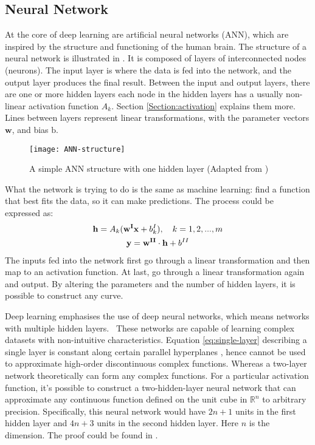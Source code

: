 \subsection{Neural Network}

At the core of deep learning are artificial neural networks (ANN), which are inspired by the structure and functioning of the human brain. 
The structure of a neural network is illustrated in . It is composed of layers of interconnected nodes (neurons). 
The input layer is where the data is fed into the network, and the output layer produces the final result. Between the input and output layers, there are one or more hidden layers 
each node in the hidden layers has a usually non-linear activation function $A_k$. Section \ref{Section:activation} explains them more. Lines between layers represent linear transformations, 
with the parameter vectors $\mathbf{w}$, and bias $\mathrm{b}$. 

\begin{figure}[!htb]
    \centering
    \texttt{[image: ANN-structure]}
    \caption{A simple ANN structure with one hidden layer (Adapted from \cite{Koc})}
    \label{Figure:ANN-structure}
\end{figure}

What the network is trying to do is the same as machine learning: find a function that best fits the data, so it can make predictions. The process could be expressed as:
\begin{gather}
    \mathbf{h} = A_k(\mathbf{w^Ix} + b^I_k),\quad k = 1, 2, ..., m \label{eq:single-layer}
\\ \mathbf{y} =\mathbf{w^{II}} \cdot \mathbf{h} + b^{II} \notag
\end{gather}
The inputs fed into the network first go through a linear transformation and then map to an activation function. At last, go through a linear transformation again and output. 
By altering the parameters and the number of hidden layers, it is possible to construct any curve. 

Deep learning emphasises the use of deep neural networks, which means networks with multiple hidden layers. \
These networks are capable of learning complex datasets with non-intuitive characteristics. 
Equation \ref{eq:single-layer} describing a single layer is constant along certain parallel hyperplanes \cite{Pinkus_1999}, hence cannot be used to approximate high-order discontinuous complex functions.
Whereas a two-layer network theoretically can form any complex functions. 
For a particular activation function, it's possible to construct a two-hidden-layer neural network that can approximate any continuous function defined on the unit cube in $\mathbb{R}^n$ to arbitrary precision. 
Specifically, this neural network would have $2n+1$ units in the first hidden layer and $4n+3$ units in the second hidden layer.
Here $n$ is the dimension. The proof could be found in \cite{HECHTNIELSEN199265}.

